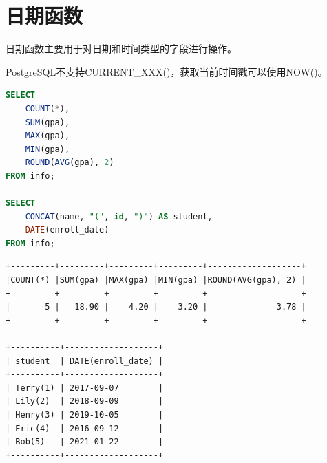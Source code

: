 \documentclass[12pt, openany, oneside]{book}
\begin{document}
\vspace{0.5cm}

\section{日期函数}

日期函数主要用于对日期和时间类型的字段进行操作。

\begin{table}[H]
	\centering
	\caption{日期函数}
\end{table}

PostgreSQL不支持CURRENT\_XXX()，获取当前时间戳可以使用NOW()。\\


\begin{lstlisting}[language=SQL]
SELECT
    COUNT(*),
    SUM(gpa),
    MAX(gpa),
    MIN(gpa),
    ROUND(AVG(gpa), 2)
FROM info;

SELECT
    CONCAT(name, "(", id, ")") AS student, 
    DATE(enroll_date)
FROM info;
\end{lstlisting}

\begin{tcolorbox}
	\begin{verbatim}
+---------+---------+---------+---------+-------------------+
|COUNT(*) |SUM(gpa) |MAX(gpa) |MIN(gpa) |ROUND(AVG(gpa), 2) |
+---------+---------+---------+---------+-------------------+
|       5 |   18.90 |    4.20 |    3.20 |              3.78 |
+---------+---------+---------+---------+-------------------+

+----------+-------------------+
| student  | DATE(enroll_date) |
+----------+-------------------+
| Terry(1) | 2017-09-07        |
| Lily(2)  | 2018-09-09        |
| Henry(3) | 2019-10-05        |
| Eric(4)  | 2016-09-12        |
| Bob(5)   | 2021-01-22        |
+----------+-------------------+
	\end{verbatim}
\end{tcolorbox}
\end{document}
